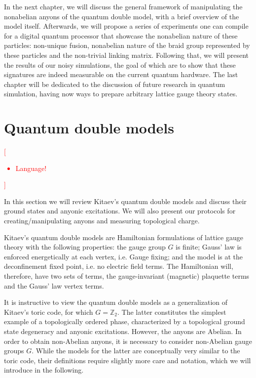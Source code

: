 \documentclass[two column]{article}
\newcommand{\caro}[1]{\textcolor{red}{[#1]}}
\begin{document}
In the next chapter, we will discuss the general framework of manipulating the nonabelian anyons of the quantum double model, with a brief overview of the model itself. Afterwards, we will propose a series of experiments one can compile for a digital quantum processor that showcase the nonabelian nature of these particles: non-unique fusion, nonabelian nature of the braid group represented by these particles and the non-trivial linking matrix. Following that, we will present the results of our noisy simulations, the goal of which are to show that these signatures are indeed measurable on the current quantum hardware. The last chapter will be dedicated to the discussion of future research in quantum simulation, having now ways to prepare arbitrary lattice gauge theory states.

\section{Quantum double models}
\caro{\begin{itemize}
\item Language!
\end{itemize}}

In this section we will review Kitaev's quantum double models\cite{Kitaev_2003} and discuss their ground states and anyonic excitations. We will also present our protocols for creating/manipulating anyons and measuring topological charge. 

Kitaev's quantum double models are Hamiltonian formulations of lattice gauge theory with the following properties:
the gauge group $G$ is finite;
Gauss' law is enforced energetically at each vertex, i.e. Gauge fixing;
and the model is at the deconfinement fixed point, i.e. no electric field terms.
The Hamiltonian will, therefore, have two sets of terms, the gauge-invariant (magnetic) plaquette terms and the Gauss' law vertex terms\cite{cui2018topological, Kitaev_2003}. 


It is instructive to view the quantum double models as a generalization of Kitaev's toric code, for which $G=\mathbb Z_2$. The latter constitutes the simplest example of a topologically ordered phase, characterized by a topological ground state degeneracy and anyonic excitations. However, the anyons are Abelian. In order to obtain non-Abelian anyons, it is necessary to consider non-Abelian gauge groups $G$. While the models for the latter are conceptually very similar to the toric code, their definitions require slightly more care and notation, which we will introduce in the following.
\end{document}
